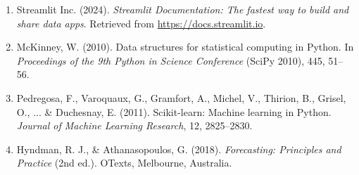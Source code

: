\documentclass[12pt, a4paper]{article}
\renewcommand{\_}{\textunderscore\allowbreak}
\begin{document}
\begin{enumerate}
    \item Streamlit Inc. (2024). \textit{Streamlit Documentation: The fastest way to build and share data apps}. Retrieved from \url{https://docs.streamlit.io}.
    
    \item McKinney, W. (2010). Data structures for statistical computing in Python. In \textit{Proceedings of the 9th Python in Science Conference} (SciPy 2010), 445, 51--56.
    
    \item Pedregosa, F., Varoquaux, G., Gramfort, A., Michel, V., Thirion, B., Grisel, O., ... \& Duchesnay, E. (2011). Scikit-learn: Machine learning in Python. \textit{Journal of Machine Learning Research}, 12, 2825--2830.
    
    \item Hyndman, R. J., \& Athanasopoulos, G. (2018). \textit{Forecasting: Principles and Practice} (2nd ed.). OTexts, Melbourne, Australia.
\end{enumerate}
\end{document}
